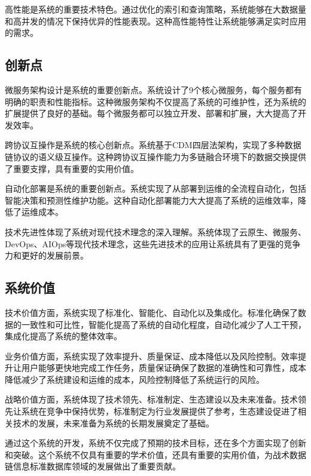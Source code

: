 高性能是系统的重要技术特色。通过优化的索引和查询策略，系统能够在大数据量和高并发的情况下保持优异的性能表现。这种高性能特性让系统能够满足实时应用的需求。

\subsection{创新点}

微服务架构设计是系统的重要创新点。系统设计了9个核心微服务，每个服务都有明确的职责和性能指标。这种微服务架构不仅提高了系统的可维护性，还为系统的扩展提供了良好的基础。每个微服务都可以独立开发、部署和扩展，大大提高了开发效率。

跨协议互操作是系统的核心创新点。系统基于CDM四层法架构，实现了多种数据链协议的语义级互操作。这种跨协议互操作能力为多链融合环境下的数据交换提供了重要支撑，具有重要的实用价值。

自动化部署是系统的重要创新点。系统实现了从部署到运维的全流程自动化，包括智能决策和预测性维护功能。这种自动化部署能力大大提高了系统的运维效率，降低了运维成本。

技术先进性体现了系统对现代技术理念的深入理解。系统体现了云原生、微服务、DevOps、AIOps等现代技术理念，这些先进技术的应用让系统具有了更强的竞争力和更好的发展前景。

\subsection{系统价值}

技术价值方面，系统实现了标准化、智能化、自动化以及集成化。标准化确保了数据的一致性和可比性，智能化提高了系统的自动化程度，自动化减少了人工干预，集成化提高了系统的整体效率。

业务价值方面，系统实现了效率提升、质量保证、成本降低以及风险控制。效率提升让用户能够更快地完成工作任务，质量保证确保了数据的准确性和可靠性，成本降低减少了系统建设和运维的成本，风险控制降低了系统运行的风险。

战略价值方面，系统体现了技术领先、标准制定、生态建设以及未来准备。技术领先让系统在竞争中保持优势，标准制定为行业发展提供了参考，生态建设促进了相关技术的发展，未来准备为系统的长期发展奠定了基础。

通过这个系统的开发，系统不仅完成了预期的技术目标，还在多个方面实现了创新和突破。这个系统不仅具有重要的学术价值，还具有重要的实用价值，为战术数据链信息标准数据库领域的发展做出了重要贡献。

